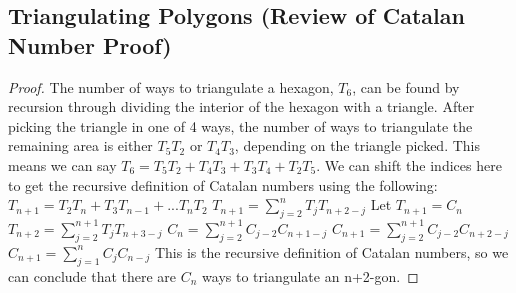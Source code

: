 \label{11-0226-1}
\subsection{Triangulating Polygons (Review of Catalan Number Proof)}
\begin{proof}
The number of ways to triangulate a hexagon, $T_6$, can be found by recursion through dividing the interior of the hexagon with a triangle. After picking the triangle in one of 4 ways, the number of ways to triangulate the remaining area is either $T_5T_2$ or $T_4T_3$, depending on the triangle picked. This means we can say $T_6=T_5T_2+T_4T_3+T_3T_4+T_2T_5$. We can shift the indices here to get the recursive definition of Catalan numbers using the following:
\newline
$T_{n+1}=T_2T_n+T_3T_{n-1}+...T_nT_2$
\newline
$T_{n+1}=\sum_{j=2}^{n} {T_jT_{n+2-j}}$
\newline
Let $T_{n+1}=C_n$
\newline
$T_{n+2}=\sum_{j=2}^{n+1} {T_jT_{n+3-j}}$
\newline
$C_n=\sum_{j=2}^{n+1} {C_{j-2}C_{n+1-j}}$
\newline
$C_{n+1}=\sum_{j=2}^{n+1} {C_{j-2}C_{n+2-j}}$
\newline
$C_{n+1}=\sum_{j=1}^{n} {C_{j}C_{n-j}}$
This is the recursive definition of Catalan numbers, so we can conclude that there are $C_n$ ways to triangulate an n+2-gon. 
\end{proof}